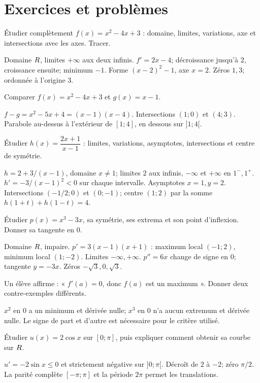 \section{Exercices et problèmes}
\label{t11s-c05-e01}
Étudier complètement $f(x)=x^2-4x+3$ : domaine, limites, variations, axe et intersections avec les axes. Tracer.
\begin{corrige}\label{sol-t11s-c05-e01}
Domaine $R$, limites $+\infty$ aux deux infinis. $f'=2x-4$; décroissance jusqu’à $2$, croissance ensuite; minimum $-1$. Forme $(x-2)^2-1$, axe $x=2$. Zéros $1,3$; ordonnée à l’origine $3$.
\end{corrige}
\label{t11s-c05-e02}
Comparer $f(x)=x^2-4x+3$ et $g(x)=x-1$.
\begin{corrige}\label{sol-t11s-c05-e02}
$f-g=x^2-5x+4=(x-1)(x-4)$. Intersections $(1;0)$ et $(4;3)$. Parabole au-dessus à l’extérieur de $[1;4]$, en dessous sur $]1;4[$.
\end{corrige}
\label{t11s-c05-e03}
Étudier $h(x)=\dfrac{2x+1}{x-1}$ : limites, variations, asymptotes, intersections et centre de symétrie.
\begin{corrige}\label{sol-t11s-c05-e03}
$h=2+3/(x-1)$, domaine $x\ne1$; limites $2$ aux infinis, $-\infty$ et $+\infty$ en $1^-,1^+$. $h'=-3/(x-1)^2<0$ sur chaque intervalle. Asymptotes $x=1,y=2$. Intersections $(-1/2;0)$ et $(0;-1)$; centre $(1;2)$ par la somme $h(1+t)+h(1-t)=4$.
\end{corrige}
\exo[Cubicité]\label{t11s-c05-e04}
Étudier $p(x)=x^3-3x$, sa symétrie, ses extrema et son point d’inflexion. Donner sa tangente en $0$.
\begin{corrige}\label{sol-t11s-c05-e04}
Domaine $R$, impaire. $p'=3(x-1)(x+1)$ : maximum local $(-1;2)$, minimum local $(1;-2)$. Limites $-\infty,+\infty$. $p''=6x$ change de signe en $0$; tangente $y=-3x$. Zéros $-\sqrt3,0,\sqrt3$.
\end{corrige}
\label{t11s-c05-e05}
Un élève affirme : « $f'(a)=0$, donc $f(a)$ est un maximum ». Donner deux contre-exemples différents.
\begin{corrige}\label{sol-t11s-c05-e05}
$x^2$ en $0$ a un minimum et dérivée nulle; $x^3$ en $0$ n’a aucun extremum et dérivée nulle. Le signe de part et d’autre est nécessaire pour le critère utilisé.
\end{corrige}
\exo[Oscillation]\label{t11s-c05-e06}
Étudier $u(x)=2\cos x$ sur $[0;\pi]$, puis expliquer comment obtenir sa courbe sur $R$.
\begin{corrige}\label{sol-t11s-c05-e06}
$u'=-2\sin x\le0$ et strictement négative sur $]0;\pi[$. Décroît de $2$ à $-2$; zéro $\pi/2$. La parité complète $[-\pi;\pi]$ et la période $2\pi$ permet les translations.
\end{corrige}

